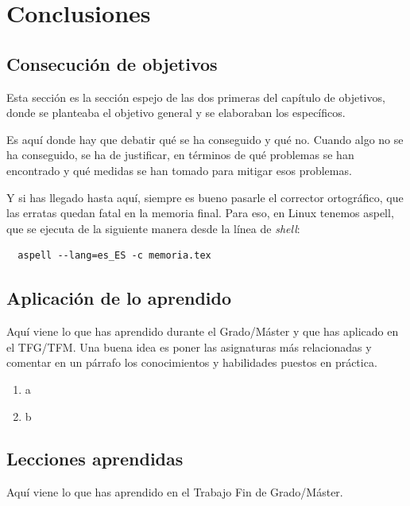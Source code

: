 \documentclass[a4paper, 12pt]{book}
\begin{document}
\cleardoublepage
\chapter{Conclusiones}
\label{chap:conclusiones}


\section{Consecución de objetivos}
\label{sec:consecucion-objetivos}

Esta sección es la sección espejo de las dos primeras del capítulo de objetivos, donde se planteaba el objetivo general y se elaboraban los específicos.

Es aquí donde hay que debatir qué se ha conseguido y qué no. 
Cuando algo no se ha conseguido, se ha de justificar, en términos de qué problemas se han encontrado y qué medidas se han tomado para mitigar esos problemas.

Y si has llegado hasta aquí, siempre es bueno pasarle el corrector ortográfico, que las erratas quedan fatal en la memoria final.
Para eso, en Linux tenemos aspell, que se ejecuta de la siguiente manera desde la línea de \emph{shell}:

\begin{verbatim}
  aspell --lang=es_ES -c memoria.tex
\end{verbatim}

\section{Aplicación de lo aprendido}
\label{sec:aplicacion}

Aquí viene lo que has aprendido durante el Grado/Máster y que has aplicado en el TFG/TFM. Una buena idea es poner las asignaturas más relacionadas y comentar en un párrafo los conocimientos y habilidades puestos en práctica.

\begin{enumerate}
  \item a
  \item b
\end{enumerate}


\section{Lecciones aprendidas}
\label{sec:lecciones_aprendidas}

Aquí viene lo que has aprendido en el Trabajo Fin de Grado/Máster.
\end{document}
